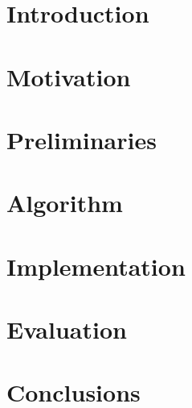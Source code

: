 






\chapter{Introduction}

\chapter{Motivation}

\chapter{Preliminaries}


\chapter{Algorithm}


\chapter{Implementation}


\chapter{Evaluation}


\chapter{Conclusions}

\printbibliography[heading=bibintoc] %



